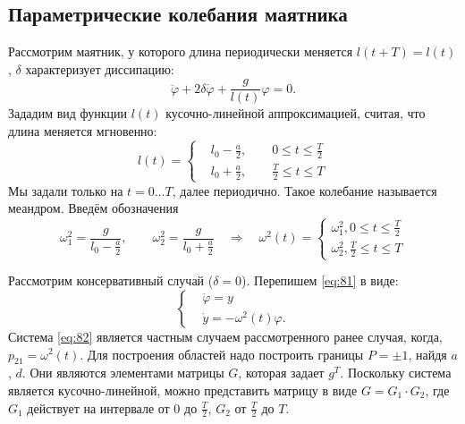 \subsection{Параметрические колебания маятника}
Рассмотрим маятник, у которого длина периодически меняется $l(t+T)=l(t)$, $\delta$ характеризует диссипацию:
\begin{equation}
	\ddot{\varphi}+2\delta \dot{\varphi}+\frac{g}{l(t)}\varphi=0.
	\label{eq:81}
\end{equation}
Зададим вид функции $l(t)$ кусочно-линейной аппроксимацией,  считая, что длина меняется мгновенно:
\begin{equation*}
	l(t)=
	\left\{\begin{aligned}
		&l_0-\frac{a}{2}, \qquad 0 \leq t \leq \frac{T}{2} \\
		&l_0+\frac{a}{2}, \qquad \frac{T}{2} \leq t \leq T		
	\end{aligned}\right.
\end{equation*}
Мы задали только на $t=0\dots T$, далее периодично. Такое колебание называется меандром. Введём обозначения
\begin{equation}
	\omega_1^2=\frac{g}{l_0-\frac{a}{2}}, \qquad \omega_2^2=\frac{g}{l_0+\frac{a}{2}} \quad \Rightarrow \quad
	\omega^2(t)=
	\left\{\begin{aligned}
		\omega^2_1, 0 \leq t \leq \frac{T}{2} \\
		\omega^2_2, \frac{T}{2} \leq t \leq T		
	\end{aligned}\right.
	\label{eq:83}	
\end{equation}

Рассмотрим консервативный случай ($\delta=0$). Перепишем \eqref{eq:81} в виде:
\begin{equation}
	\left\{\begin{aligned}
		&\dot{\varphi}=y \\
		&\dot{y} =-\omega^2(t)\varphi.	
	\end{aligned}\right.
	\label{eq:82}
\end{equation}
Система \eqref{eq:82} является частным случаем рассмотренного ранее случая, когда, $p_{21}=\omega^2(t)$. Для построения областей надо построить границы $P=\pm 1$, найдя $a$, $d$. Они являются элементами матрицы $G$, которая задает $g^T$. Поскольку система является кусочно-линейной, можно представить матрицу в виде $G=G_1\cdot G_2$, где $G_1$ действует на интервале от 0 до $\frac{T}{2}$, $G_2$ от $\frac{T}{2}$ до $T$. 

